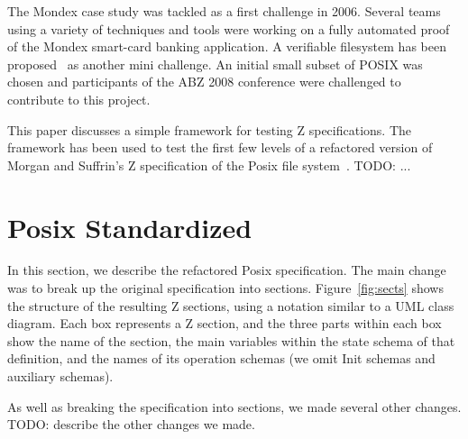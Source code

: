 \documentclass{llncs}
\begin{document}
The Mondex case study was tackled as a first challenge in 2006.
Several teams using a variety of techniques and tools were working on
a fully automated proof of the Mondex smart-card banking application.
A verifiable filesystem has been proposed~\cite{JosHol07} as another
mini challenge.  An initial small subset of POSIX was chosen and
participants of the ABZ 2008 conference were challenged to contribute
to this project.

This paper discusses a simple framework for testing Z specifications.
The framework has been used to test the first few levels of a
refactored version of Morgan and Suffrin's Z specification of
the Posix file system~\cite{MorSufTOSE84}.  TODO: ...



\section{Posix Standardized}

In this section, we describe the refactored Posix specification.
The main change was to break up the original specification into
sections.  Figure~\ref{fig:sects} shows the structure of the
resulting Z sections, using a notation similar to a UML class diagram.
Each box represents a Z section, and the three parts within each box
show the name of the section, the main variables within the state
schema of that definition, and the names of its operation schemas
(we omit Init schemas and auxiliary schemas).

As well as breaking the specification into sections, we made several other
changes.  TODO: describe the other changes we made.
\end{document}
